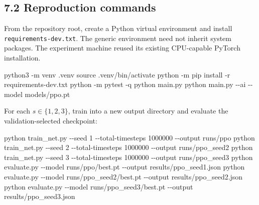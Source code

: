 \documentclass[
  11pt,
]{article}
\newenvironment{Shaded}{}{}
\newcommand{\AttributeTok}[1]{\textcolor[rgb]{0.49,0.56,0.16}{#1}}
\newcommand{\BuiltInTok}[1]{\textcolor[rgb]{0.00,0.50,0.00}{#1}}
\newcommand{\ExtensionTok}[1]{#1}
\newcommand{\NormalTok}[1]{#1}
\begin{document}
\subsection{7.2 Reproduction commands}\label{reproduction-commands}

From the repository root, create a Python virtual environment and
install \texttt{requirements-dev.txt}. The generic environment need not
inherit system packages. The experiment machine reused its existing
CPU-capable PyTorch installation.

\begin{Shaded}
\begin{Highlighting}[]
\ExtensionTok{python3} \AttributeTok{{-}m}\NormalTok{ venv .venv}
\BuiltInTok{source}\NormalTok{ .venv/bin/activate}
\ExtensionTok{python} \AttributeTok{{-}m}\NormalTok{ pip install }\AttributeTok{{-}r}\NormalTok{ requirements{-}dev.txt}
\ExtensionTok{python} \AttributeTok{{-}m}\NormalTok{ pytest }\AttributeTok{{-}q}
\ExtensionTok{python}\NormalTok{ main.py}
\ExtensionTok{python}\NormalTok{ main.py }\AttributeTok{{-}{-}ai} \AttributeTok{{-}{-}model}\NormalTok{ models/ppo.pt}
\end{Highlighting}
\end{Shaded}

For each \(s\in\{1,2,3\}\), train into a new output directory and
evaluate the validation-selected checkpoint:

\begin{Shaded}
\begin{Highlighting}[]
\ExtensionTok{python}\NormalTok{ train\_net.py }\AttributeTok{{-}{-}seed}\NormalTok{ 1 }\AttributeTok{{-}{-}total{-}timesteps}\NormalTok{ 1000000 }\AttributeTok{{-}{-}output}\NormalTok{ runs/ppo}
\ExtensionTok{python}\NormalTok{ train\_net.py }\AttributeTok{{-}{-}seed}\NormalTok{ 2 }\AttributeTok{{-}{-}total{-}timesteps}\NormalTok{ 1000000 }\AttributeTok{{-}{-}output}\NormalTok{ runs/ppo\_seed2}
\ExtensionTok{python}\NormalTok{ train\_net.py }\AttributeTok{{-}{-}seed}\NormalTok{ 3 }\AttributeTok{{-}{-}total{-}timesteps}\NormalTok{ 1000000 }\AttributeTok{{-}{-}output}\NormalTok{ runs/ppo\_seed3}
\ExtensionTok{python}\NormalTok{ evaluate.py }\AttributeTok{{-}{-}model}\NormalTok{ runs/ppo/best.pt }\AttributeTok{{-}{-}output}\NormalTok{ results/ppo\_seed1.json}
\ExtensionTok{python}\NormalTok{ evaluate.py }\AttributeTok{{-}{-}model}\NormalTok{ runs/ppo\_seed2/best.pt }\AttributeTok{{-}{-}output}\NormalTok{ results/ppo\_seed2.json}
\ExtensionTok{python}\NormalTok{ evaluate.py }\AttributeTok{{-}{-}model}\NormalTok{ runs/ppo\_seed3/best.pt }\AttributeTok{{-}{-}output}\NormalTok{ results/ppo\_seed3.json}
\end{Highlighting}
\end{Shaded}
\end{document}
